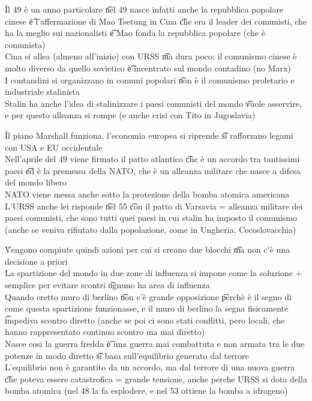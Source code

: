 \documentclass[12pt]{article}
\begin{document}
\v

Il 49 è un anno particolare \t nel 49 nasce infatti anche la repubblica popolare cinese \t è l'affermazione di Mao Tsetung in Cina \t che era il leader dei comunisti, che ha la meglio sui nazionalisti \t e Mao fonda la repubblica popolare (che è comunista) \\
Cina si allea (almeno all'inizio) con URSS \t ma dura poco: il comunismo cinese è molto diverso da quello sovietico \t è incentrato sul mondo contadino (no Marx) \\
I contandini si organizzano in comuni popolari \t non è il comunismo proletario e industriale stalinista \\
Stalin ha anche l'idea di stalinizzare i paesi comunisti del mondo \t vuole asservire, e per questo alleanza si rompe (e anche crisi con Tito in Jugoslavia)

\v

Il piano Marshall funziona, l'economia europea si riprende \t si rafforzano legami con USA e EU occidentale \\
Nell'aprile del 49 viene firmato il patto atlantico \t che è un accordo tra tantissimi paesi \t ed è la premessa della NATO, che è un alleanza militare che nasce a difesa del mondo libero \\
NATO viene messa anche sotto la protezione della bomba atomica americana \\
L'URSS anche lei risponde \t nel 55 \t con il patto di Varsavia = alleanza militare dei paesi comunisti, che sono tutti quei paesi in cui stalin ha imposto il comunismo (anche se veniva rifiutato dalla popolazione, come in Ungheria, Cecoslovacchia)

\v

Vengono compiute quindi azioni per cui si creano due blocchi \t ma non c'è una decisione a priori \\
La spartizione del mondo in due zone di influenza si impone come la soluzione + semplice per evitare scontri \t ognuno ha area di influenza \\
Quando eretto muro di berlino \t non c'è grande opposizione \t perchè è il segno di come questa spartizione funzionasse, e il muro di berlino la segna fisicamente \t impediva scontro diretto (anche se poi ci sono stati conflitti, pero locali, che hanno rappresentato continuo scontro ma mai diretto) \\
Nasce cosi la guerra fredda \t è una guerra mai combattuta e non armata tra le due potenze in modo diretto \t si basa sull'equilibrio generato dal terrore \\
L'equilibrio non è garantito da un accordo, ma dal terrore di una nuova guerra \t che poteva essere catastrofica = grande tensione, anche perche URSS si dota della bomba atomica (nel 48 la fa esplodere, e nel 53 ottiene la bomba a idrogeno)
\end{document}
